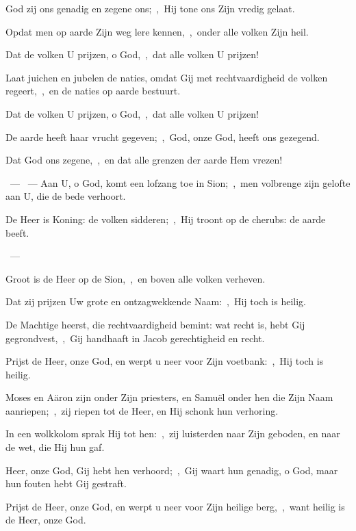\documentclass[12pt,twoside,a5paper]{article}
\begin{document}
\begin{halfparskip}
   God zij ons genadig en zegene ons;~\sep\ Hij tone ons Zijn vredig gelaat.

  Opdat men op aarde Zijn weg lere kennen,~\sep\ onder alle volken Zijn heil.

  Dat de volken U prijzen, o God,~\sep\ dat alle volken U prijzen!

  Laat juichen en jubelen de naties, omdat Gij met rechtvaardigheid de volken regeert,~\sep\ en de naties op aarde bestuurt.

  Dat de volken U prijzen, o God,~\sep\ dat alle volken U prijzen!

  De aarde heeft haar vrucht gegeven;~\sep\ God, onze God, heeft ons gezegend.

  Dat God ons zegene,~\sep\ en dat alle grenzen der aarde Hem vrezen!
\end{halfparskip}

\begin{halfparskip}
  ~--- ~---  Aan U, o God, komt een lofzang toe in Sion;~\sep\ men volbrenge zijn gelofte aan
  U, die de bede verhoort.
\end{halfparskip}

\begin{halfparskip}
   
\end{halfparskip}

\begin{halfparskip}
   De Heer is Koning: de volken sidderen;~\sep\ Hij troont op de cherubs: de aarde beeft.

  ~--- 

  Groot is de Heer op de Sion,~\sep\ en boven alle volken verheven.

  Dat zij prijzen Uw grote en ontzagwekkende Naam:~\sep\ Hij toch is heilig.

  De Machtige heerst, die rechtvaardigheid bemint: wat recht is, hebt Gij gegrondvest,~\sep\ Gij handhaaft in Jacob gerechtigheid en recht.

  Prijst de Heer, onze God, en werpt u neer voor Zijn voetbank:~\sep\ Hij toch is heilig.

  Moses en Aäron zijn onder Zijn priesters, en Samuël onder hen die Zijn Naam aanriepen;~\sep\ zij riepen tot de Heer, en Hij schonk hun verhoring.

  In een wolkkolom sprak Hij tot hen:~\sep\ zij luisterden naar Zijn geboden, en naar de wet, die Hij hun gaf.

  Heer, onze God, Gij hebt hen verhoord;~\sep\ Gij waart hun genadig, o God, maar hun fouten hebt Gij gestraft.

  Prijst de Heer, onze God, en werpt u neer voor Zijn heilige berg,~\sep\ want heilig is de Heer, onze God.
\end{halfparskip}
\end{document}

